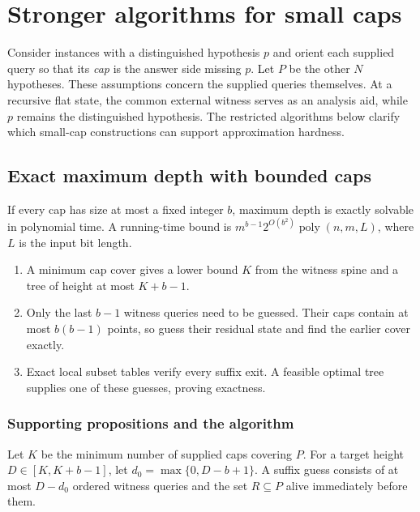 \section{Stronger algorithms for small caps}
\label{sec:small-caps}

Consider instances with a distinguished hypothesis $p$ and orient
each supplied query so that its \emph{cap} is the answer side missing
$p$. Let $P$ be the other $N$ hypotheses. These assumptions concern
the supplied queries themselves. At a recursive flat state, the
common external witness serves as an analysis aid, while $p$ remains
the distinguished hypothesis.
The restricted algorithms below clarify which small-cap constructions
can support approximation hardness.

\subsection{Exact maximum depth with bounded caps}

\begin{theorem}\label{thm:bounded-cap-height}
If every cap has size at most a fixed integer $b$, maximum depth is
exactly solvable in polynomial time. A running-time bound is
$m^{b-1}2^{O(b^2)}\operatorname{poly}(n,m,L)$, where $L$ is the
input bit length.
\end{theorem}

\begin{proofstrategy}
\begin{enumerate}
\item A minimum cap cover gives a lower bound $K$ from the
witness spine and a tree of height at most $K+b-1$.
\item Only the last $b-1$ witness queries need to be guessed.
Their caps contain at most $b(b-1)$ points, so guess their residual
state and find the earlier cover exactly.
\item Exact local subset tables verify every suffix exit. A feasible
optimal tree supplies one of these guesses, proving exactness.
\end{enumerate}
\end{proofstrategy}

\subsubsection{Supporting propositions and the algorithm}

Let $K$ be the minimum number of supplied caps covering $P$. For a
target height $D\in[K,K+b-1]$, let $d_0=\max\{0,D-b+1\}$.
A suffix guess consists of at most $D-d_0$ ordered witness queries
and the set $R\subseteq P$ alive immediately before them.

